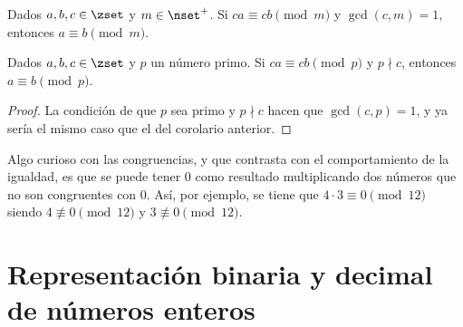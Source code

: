 \begin{corollary}
  Dados $a, b, c \in \zset$ y $m \in \nset^{+}$. Si $ca \equiv cb \pmod m$ y
  $\gcd(c, m) = 1$, entonces $a \equiv b \pmod m$.
\end{corollary}

\begin{corollary}
  Dados $a, b, c \in \zset$ y $p$ un número primo. Si $ca \equiv cb \pmod p$
  y $p \nmid c$, entonces $a \equiv b \pmod p$.
\end{corollary}

\begin{proof}
  La condición de que $p$ sea primo y $p \nmid c$ hacen que $\gcd(c, p) =
  1$, y ya sería el mismo caso que el del corolario anterior.
\end{proof}

Algo curioso con las congruencias, y que contrasta con el comportamiento de
la igualdad, es que se puede tener 0 como resultado multiplicando dos
números que no son congruentes con 0. Así, por ejemplo, se tiene que $4
\cdot 3 \equiv 0 \pmod {12}$ siendo $4 \not\equiv 0 \pmod {12}$ y $3
\not\equiv 0 \pmod {12}$.






\section{Representación binaria y decimal de números enteros}
